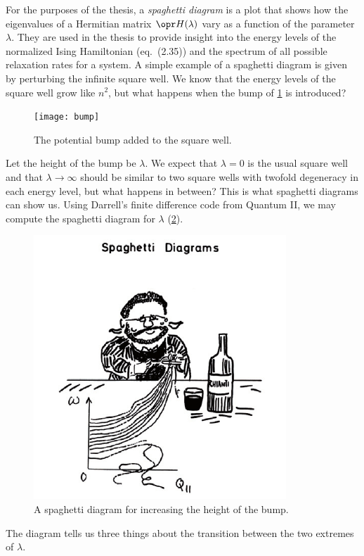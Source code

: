 \documentclass[12pt]{article}
\begin{document}
For the purposes of the thesis, a \emph{spaghetti diagram} is a plot that shows
how the eigenvalues of a Hermitian matrix $\ham(\lambda)$ vary as a function of
the parameter $\lambda$. They are used in the thesis to provide insight into the
energy levels of the normalized Ising Hamiltonian (eq.~(2.35)) and the spectrum
of all possible relaxation rates for a system. A simple example of a spaghetti
diagram is given by perturbing the infinite square well. We know that the energy
levels of the square well grow like $n^2$, but what happens when the bump of
\cref{fig:bump} is introduced?
\begin{figure}[h]
  \centering
  \texttt{[image: bump]}
  \caption{%
    The potential bump added to the square well.
  }\label{fig:bump}
\end{figure}
Let the height of the bump be $\lambda$. We expect that $\lambda = 0$ is the
usual square well and that $\lambda \to \infty$ should be similar to two square
wells with twofold degeneracy in each energy level, but what happens in between?
This is what spaghetti diagrams can show us. Using Darrell's finite difference
code from Quantum II, we may compute the spaghetti diagram for $\lambda$
(\cref{fig:spaghetti}).
\begin{figure}[h]
  \centering
  \includegraphics[width=0.75\linewidth]{spaghetti}
  \caption{%
    A spaghetti diagram for increasing the height of the bump.
  }\label{fig:spaghetti}
\end{figure}
The diagram tells us three things about the transition between the two extremes
of $\lambda$.
\end{document}
